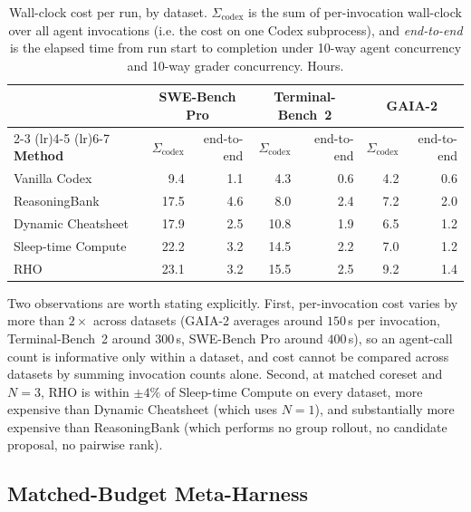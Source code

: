 \documentclass{llmxive}
\providecommand{\method}{\textsc{RHO}}
\begin{document}
\begin{table}[t]
\centering
\small
\begin{tabular}{l rr rr rr}
\toprule
& \multicolumn{2}{c}{\textbf{SWE-Bench Pro}} & \multicolumn{2}{c}{\textbf{Terminal-Bench~2}} & \multicolumn{2}{c}{\textbf{GAIA-2}} \\
\cmidrule(lr){2-3} \cmidrule(lr){4-5} \cmidrule(lr){6-7}
\textbf{Method} & $\Sigma_{\mathrm{codex}}$ & end-to-end & $\Sigma_{\mathrm{codex}}$ & end-to-end & $\Sigma_{\mathrm{codex}}$ & end-to-end \\
\midrule
Vanilla Codex                                 &  9.4 & 1.1 &  4.3 & 0.6 &  4.2 & 0.6 \\
ReasoningBank \citep{ouyang2026reasoningbank}      & 17.5 & 4.6 &  8.0 & 2.4 &  7.2 & 2.0 \\
Dynamic Cheatsheet \citep{suzgun2025dynamiccheatsheet} & 17.9 & 2.5 & 10.8 & 1.9 &  6.5 & 1.2 \\
Sleep-time Compute \citep{lin2025sleeptime}           & 22.2 & 3.2 & 14.5 & 2.2 &  7.0 & 1.2 \\
\method{}                                & 23.1 & 3.2 & 15.5 & 2.5 &  9.2 & 1.4 \\
\bottomrule
\end{tabular}
\caption{Wall-clock cost per run, by dataset. $\Sigma_{\mathrm{codex}}$ is the sum of per-invocation wall-clock over all agent invocations (i.e. the cost on one Codex subprocess), and \emph{end-to-end} is the elapsed time from run start to completion under 10-way agent concurrency and 10-way grader concurrency. Hours.}
\label{tab:cost-walltime}
\end{table}

Two observations are worth stating explicitly.
First, per-invocation cost varies by more than $2\times$ across datasets (GAIA-2 averages around $150$\,s per invocation, Terminal-Bench~2 around $300$\,s, SWE-Bench Pro around $400$\,s), so an agent-call count is informative only within a dataset, and cost cannot be compared across datasets by summing invocation counts alone.
Second, at matched coreset and $N=3$, \method{} is within $\pm 4\%$ of Sleep-time Compute on every dataset, more expensive than Dynamic Cheatsheet (which uses $N=1$), and substantially more expensive than ReasoningBank (which performs no group rollout, no candidate proposal, no pairwise rank).

\subsection{Matched-Budget Meta-Harness}\label{app:cost:mh}
\end{document}
